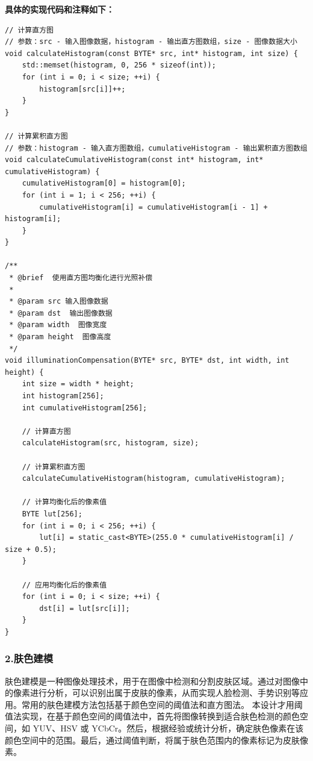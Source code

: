 \documentclass[12pt,hyperref,a4paper,UTF8]{ctexart}
\begin{document}
        \textbf{具体的实现代码和注释如下：}
        \begin{lstlisting}[caption={光照补偿函数}, label={lst:example}]
// 计算直方图
// 参数：src - 输入图像数据，histogram - 输出直方图数组，size - 图像数据大小
void calculateHistogram(const BYTE* src, int* histogram, int size) {
    std::memset(histogram, 0, 256 * sizeof(int));
    for (int i = 0; i < size; ++i) {
        histogram[src[i]]++;
    }
}

// 计算累积直方图
// 参数：histogram - 输入直方图数组，cumulativeHistogram - 输出累积直方图数组
void calculateCumulativeHistogram(const int* histogram, int* cumulativeHistogram) {
    cumulativeHistogram[0] = histogram[0];
    for (int i = 1; i < 256; ++i) {
        cumulativeHistogram[i] = cumulativeHistogram[i - 1] + histogram[i];
    }
}

/**
 * @brief  使用直方图均衡化进行光照补偿
 * 
 * @param src 输入图像数据
 * @param dst  输出图像数据
 * @param width  图像宽度
 * @param height  图像高度
 */
void illuminationCompensation(BYTE* src, BYTE* dst, int width, int height) {
    int size = width * height;
    int histogram[256];
    int cumulativeHistogram[256];

    // 计算直方图
    calculateHistogram(src, histogram, size);

    // 计算累积直方图
    calculateCumulativeHistogram(histogram, cumulativeHistogram);

    // 计算均衡化后的像素值
    BYTE lut[256];
    for (int i = 0; i < 256; ++i) {
        lut[i] = static_cast<BYTE>(255.0 * cumulativeHistogram[i] / size + 0.5);
    }

    // 应用均衡化后的像素值
    for (int i = 0; i < size; ++i) {
        dst[i] = lut[src[i]];
    }
}
        \end{lstlisting}




        \subsubsection*{\large \textbf{2.肤色建模}}

        肤色建模是一种图像处理技术，用于在图像中检测和分割皮肤区域。通过对图像中的像素进行分析，可以识别出属于皮肤的像素，从而实现人脸检测、手势识别等应用。常用的肤色建模方法包括基于颜色空间的阈值法和直方图法。
        本设计才用阈值法实现，在基于颜色空间的阈值法中，首先将图像转换到适合肤色检测的颜色空间，如 YUV、HSV 或 YCbCr。然后，根据经验或统计分析，确定肤色像素在该颜色空间中的范围。最后，通过阈值判断，将属于肤色范围内的像素标记为皮肤像素。
\end{document}
